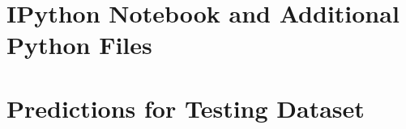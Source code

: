 \documentclass[journal]{IEEEtran}
\begin{document}
\appendices
\section{IPython Notebook and Additional Python Files}

\section{Predictions for Testing Dataset}


%
%


\ifCLASSOPTIONcaptionsoff
  \newpage
\fi





%
%
%


%
%

% 
\end{document}
